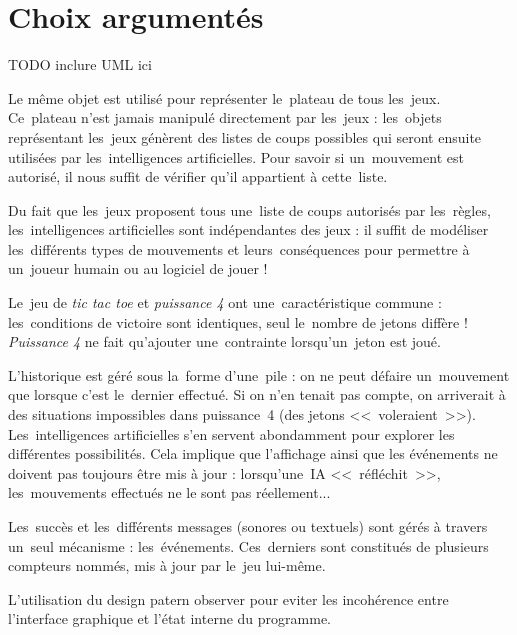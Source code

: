 \section{Choix argumentés}
TODO inclure UML ici

Le même objet est utilisé pour représenter le~plateau de tous les~jeux.
Ce~plateau n'est jamais manipulé directement par les~jeux :
les~objets représentant les~jeux génèrent des listes de coups possibles qui
seront ensuite utilisées par les~intelligences artificielles.
Pour savoir si un~mouvement est autorisé, il nous suffit de vérifier qu'il appartient à cette~liste. 

Du fait que les~jeux proposent tous une~liste de coups autorisés par les~règles,
les~intelligences artificielles sont indépendantes des jeux :
il suffit de modéliser les~différents types de mouvements et leurs~conséquences pour permettre à un~joueur humain ou au logiciel de jouer !

Le~jeu de \textit{tic tac toe} et \textit{puissance 4} ont une~caractéristique commune : 
les~conditions de victoire sont identiques, seul le~nombre de jetons diffère !
\textit{Puissance 4} ne fait qu'ajouter une~contrainte lorsqu'un~jeton est joué.

L'historique est géré sous la~forme d'une~pile : 
on ne peut défaire un~mouvement que lorsque c'est le~dernier effectué. 
Si on n'en tenait pas compte, on arriverait à des situations impossibles dans puissance~4 
(des jetons <<~voleraient~>>). Les~intelligences artificielles s'en servent abondamment pour explorer les différentes possibilités. 
Cela implique que l'affichage ainsi que les événements ne doivent pas toujours être mis à jour : lorsqu'une~IA <<~réfléchit~>>, les~mouvements effectués ne le sont pas réellement...

Les~succès et les~différents messages (sonores ou textuels) sont gérés à travers un~seul mécanisme : 
les~événements. Ces~derniers sont constitués de plusieurs compteurs nommés, mis à jour par le~jeu lui-même. 

L'utilisation du design patern observer pour eviter les incohérence entre l'interface graphique et l'état interne du programme.